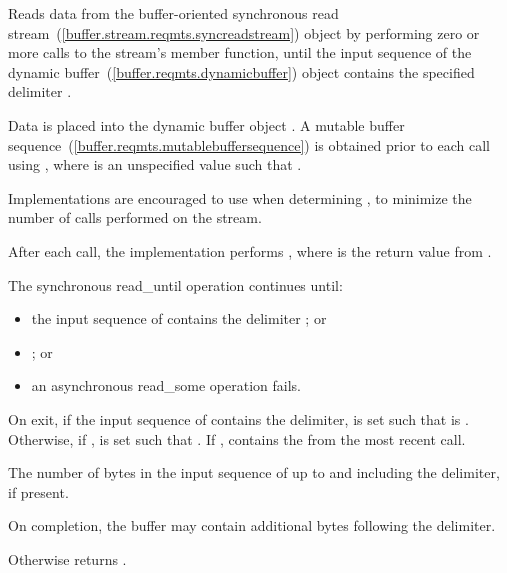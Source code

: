 \begin{itemdescr}
\pnum
\effects Reads data from the buffer-oriented synchronous read stream~(\ref{buffer.stream.reqmts.syncreadstream}) object  by performing zero or more calls to the stream's  member function, until the input sequence of the dynamic buffer~(\ref{buffer.reqmts.dynamicbuffer}) object  contains the specified delimiter .

\pnum
Data is placed into the dynamic buffer object . A mutable buffer sequence~(\ref{buffer.reqmts.mutablebuffersequence}) is obtained prior to each  call using , where  is an unspecified value such that . \begin{note} Implementations are encouraged to use  when determining , to minimize the number of  calls performed on the stream. \end{note} After each  call, the implementation performs , where  is the return value from .

\pnum
The synchronous read_until operation continues until:

\begin{itemize}
\item
the input sequence of  contains the delimiter ; or
\item
{}; or
\item
an asynchronous read_some operation fails.
\end{itemize}

\pnum
On exit, if the input sequence of  contains the delimiter,  is set such that  is . Otherwise, if ,  is set such that . If ,  contains the  from the most recent  call.

\pnum
\returns The number of bytes in the input sequence of  up to and including the delimiter, if present. \begin{note} On completion, the buffer may contain additional bytes following the delimiter. \end{note} Otherwise returns .
\end{itemdescr}



